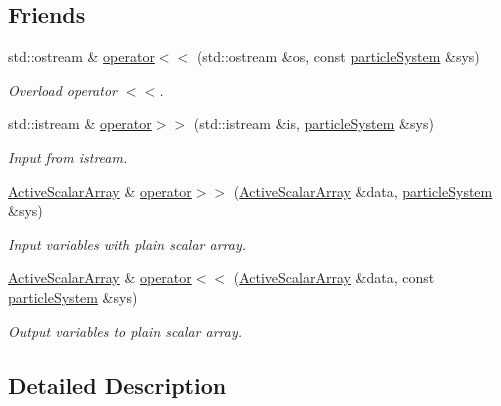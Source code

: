 \subsection*{Friends}
\begin{DoxyCompactItemize}
\item 
std\+::ostream \& \mbox{\hyperlink{classparticle_system_a58e2c35978a7eb211e7206a05855b331}{operator$<$$<$}} (std\+::ostream \&os, const \mbox{\hyperlink{classparticle_system}{particle\+System}} \&sys)
\begin{DoxyCompactList}\small\item\em Overload operator $<$$<$. \end{DoxyCompactList}\item 
std\+::istream \& \mbox{\hyperlink{classparticle_system_a7c8a355dd7f5c30b6f54c341bf672d10}{operator$>$$>$}} (std\+::istream \&is, \mbox{\hyperlink{classparticle_system}{particle\+System}} \&sys)
\begin{DoxyCompactList}\small\item\em Input from istream. \end{DoxyCompactList}\item 
\mbox{\hyperlink{classparticle_system_adeaa416917733980026d138dfde2f7ab}{Active\+Scalar\+Array}} \& \mbox{\hyperlink{classparticle_system_affbb0c2390b4b7179ea658e1de2a247e}{operator$>$$>$}} (\mbox{\hyperlink{classparticle_system_adeaa416917733980026d138dfde2f7ab}{Active\+Scalar\+Array}} \&data, \mbox{\hyperlink{classparticle_system}{particle\+System}} \&sys)
\begin{DoxyCompactList}\small\item\em Input variables with plain scalar array. \end{DoxyCompactList}\item 
\mbox{\hyperlink{classparticle_system_adeaa416917733980026d138dfde2f7ab}{Active\+Scalar\+Array}} \& \mbox{\hyperlink{classparticle_system_a2516759aad9a8eb2bfeb0ceabbf3c071}{operator$<$$<$}} (\mbox{\hyperlink{classparticle_system_adeaa416917733980026d138dfde2f7ab}{Active\+Scalar\+Array}} \&data, const \mbox{\hyperlink{classparticle_system}{particle\+System}} \&sys)
\begin{DoxyCompactList}\small\item\em Output variables to plain scalar array. \end{DoxyCompactList}\end{DoxyCompactItemize}


\subsection{Detailed Description}
